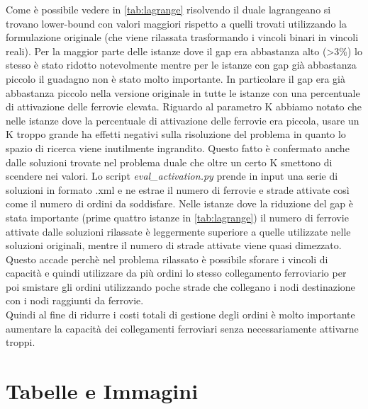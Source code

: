 \documentclass{article}
\begin{document}
Come è possibile vedere in \cref{tab:lagrange} risolvendo il duale lagrangeano si trovano lower-bound con valori maggiori rispetto a quelli trovati utilizzando la formulazione originale (che viene rilassata trasformando i vincoli binari in vincoli reali). Per la maggior parte delle istanze dove il gap era abbastanza alto (>3\%) lo stesso è stato ridotto notevolmente mentre per le istanze con gap già abbastanza piccolo il guadagno non è stato molto importante. In particolare il gap era già abbastanza piccolo nella versione originale in tutte le istanze con una percentuale di attivazione delle ferrovie elevata. Riguardo al parametro K abbiamo notato che nelle istanze dove la percentuale di attivazione delle ferrovie era piccola, usare un K troppo grande ha effetti negativi sulla risoluzione del problema in quanto lo spazio di ricerca viene inutilmente ingrandito. Questo fatto è confermato anche dalle soluzioni trovate nel problema duale che oltre un certo K smettono di scendere nei valori.
Lo script \emph{eval\_activation.py} prende in input una serie di soluzioni in formato .xml e ne estrae il numero di ferrovie e strade attivate così come il numero di ordini da soddisfare. Nelle istanze dove la riduzione del gap è stata importante (prime quattro istanze in \cref{tab:lagrange}) il numero di ferrovie attivate dalle soluzioni rilassate è leggermente superiore a quelle utilizzate nelle soluzioni originali, mentre il numero di strade attivate viene quasi dimezzato. Questo accade perchè nel problema rilassato è possibile sforare i vincoli di capacità e quindi utilizzare da più ordini lo stesso collegamento ferroviario per poi smistare gli ordini utilizzando poche strade che collegano i nodi destinazione con i nodi raggiunti da ferrovie.
\\
Quindi al fine di ridurre i costi totali di gestione degli ordini è molto importante aumentare la capacità dei collegamenti ferroviari senza necessariamente attivarne troppi.

\clearpage

\section{Tabelle e Immagini}
\label{appendice}
\end{document}
